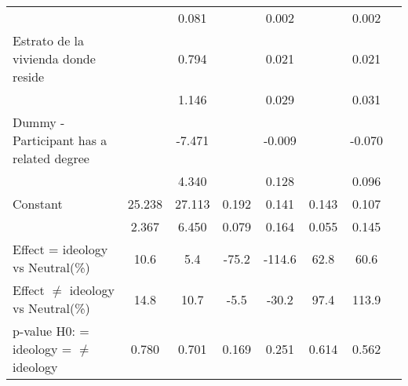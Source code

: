 \begin{table}[H]
{\begin{threeparttable}
\begin{tabular}{lccccccc}
                    &                     &       0.081         &                     &       0.002         &                     &       0.002         \\
Estrato de la vivienda donde reside&                     &       0.794         &                     &       0.021         &                     &       0.021         \\
                    &                     &       1.146         &                     &       0.029         &                     &       0.031         \\
Dummy - Participant has a related degree&                     &      -7.471\sym{*}  &                     &      -0.009         &                     &      -0.070         \\
                    &                     &       4.340         &                     &       0.128         &                     &       0.096         \\
Constant            &      25.238\sym{***}&      27.113\sym{***}&       0.192\sym{**} &       0.141         &       0.143\sym{**} &       0.107         \\
                    &       2.367         &       6.450         &       0.079         &       0.164         &       0.055         &       0.145         \\
Effect = ideology vs Neutral(\%)&        10.6         &         5.4         &       -75.2         &      -114.6         &        62.8         &        60.6         \\
Effect $\neq$ ideology vs Neutral(\%)&        14.8         &        10.7         &        -5.5         &       -30.2         &        97.4         &       113.9         \\
p-value H0: = ideology = $\neq$ ideology&       0.780         &       0.701         &       0.169         &       0.251         &       0.614         &       0.562         \\

\end{tabular}
\end{threeparttable}}
\end{table}
